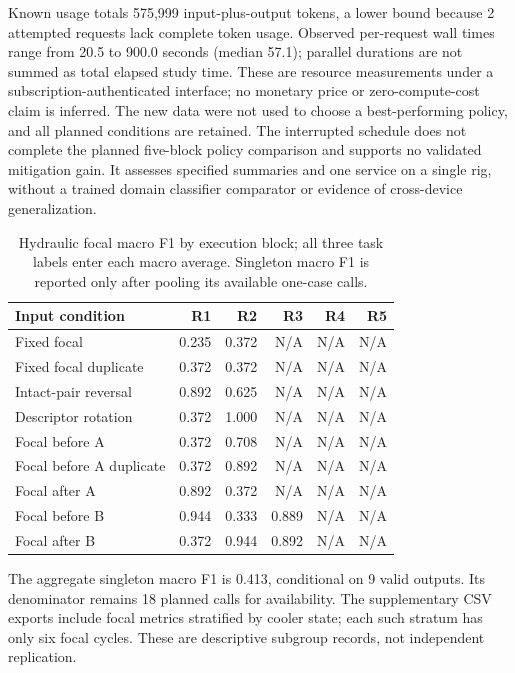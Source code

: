 \documentclass[11pt,a4paper]{article}
\begin{document}
Known usage totals 575,999 input-plus-output tokens, a lower bound because 2 attempted requests lack complete token usage. Observed per-request wall times range from 20.5 to 900.0 seconds (median 57.1); parallel durations are not summed as total elapsed study time. These are resource measurements under a subscription-authenticated interface; no monetary price or zero-compute-cost claim is inferred. The new data were not used to choose a best-performing policy, and all planned conditions are retained. The interrupted schedule does not complete the planned five-block policy comparison and supports no validated mitigation gain. It assesses specified summaries and one service on a single rig, without a trained domain classifier comparator or evidence of cross-device generalization.

\begin{table}[htbp]\centering\small
\caption{Hydraulic focal macro F1 by execution block; all three task labels enter each macro average. Singleton macro F1 is reported only after pooling its available one-case calls.}
\label{tab:hydraulic_f1}
\begin{tabular}{@{}lrrrrr@{}}\toprule
Input condition & R1 & R2 & R3 & R4 & R5 \\\midrule
Fixed focal & 0.235 & 0.372 & N/A & N/A & N/A \\
Fixed focal duplicate & 0.372 & 0.372 & N/A & N/A & N/A \\
Intact-pair reversal & 0.892 & 0.625 & N/A & N/A & N/A \\
Descriptor rotation & 0.372 & 1.000 & N/A & N/A & N/A \\
Focal before A & 0.372 & 0.708 & N/A & N/A & N/A \\
Focal before A duplicate & 0.372 & 0.892 & N/A & N/A & N/A \\
Focal after A & 0.892 & 0.372 & N/A & N/A & N/A \\
Focal before B & 0.944 & 0.333 & 0.889 & N/A & N/A \\
Focal after B & 0.372 & 0.944 & 0.892 & N/A & N/A \\
\bottomrule\end{tabular}\end{table}

The aggregate singleton macro F1 is 0.413, conditional on 9 valid outputs. Its denominator remains 18 planned calls for availability. The supplementary CSV exports include focal metrics stratified by cooler state; each such stratum has only six focal cycles. These are descriptive subgroup records, not independent replication.
\end{document}
